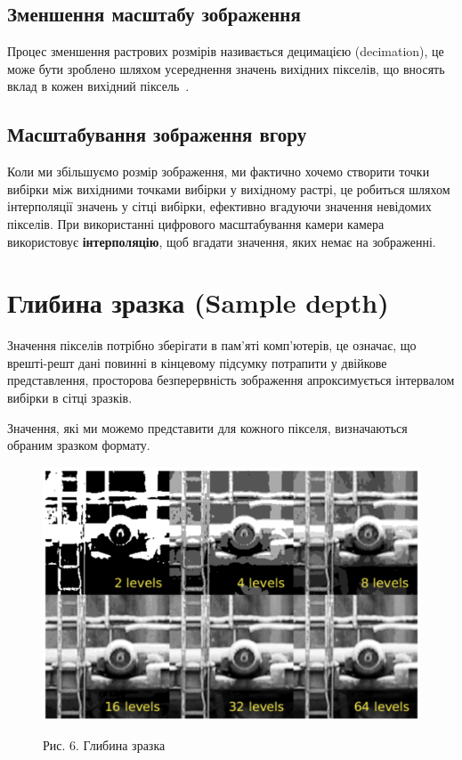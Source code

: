 \documentclass[a4paper,12pt]{article}
\begin{document}
    \subsection{Зменшення масштабу зображення}\label{subsec:downscaling}
    Процес зменшення растрових розмірів називається децимацією (decimation), це може бути зроблено шляхом усереднення значень вихідних пікселів, що вносять вклад в кожен вихідний піксель~\cite{gimp:1}.

    \subsection{Масштабування зображення вгору}\label{subsec:upscaling}
    Коли ми збільшуємо розмір зображення, ми фактично хочемо створити точки вибірки між вихідними точками вибірки у вихідному растрі, це робиться шляхом інтерполяції значень у сітці вибірки, ефективно вгадуючи значення невідомих пікселів.
    При використанні цифрового масштабування камери камера використовує \textbf{інтерполяцію}, щоб вгадати значення, яких немає на зображенні.


    \section{Глибина зразка (Sample depth)}\label{sec:sample_depth}
    Значення пікселів потрібно зберігати в пам’яті комп’ютерів, це означає, що врешті-решт дані повинні в кінцевому підсумку потрапити у двійкове представлення, просторова безперервність зображення апроксимується інтервалом вибірки в сітці зразків.

    Значення, які ми можемо представити для кожного пікселя, визначаються обраним зразком формату.

    \begin{figure}
        \label{fig:image6}
        \centering
        \includegraphics[scale=0.5]{image6.png}

        Рис. 6. Глибина зразка
    \end{figure}
\end{document}
